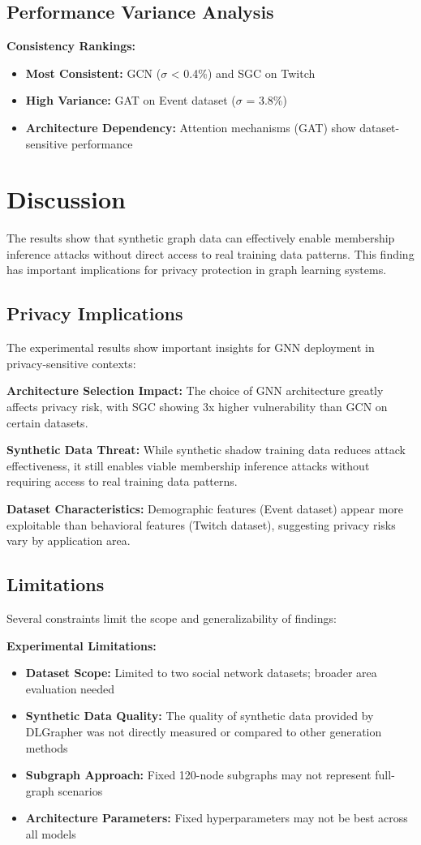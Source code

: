 \documentclass{article}
\begin{document}
\subsection{Performance Variance Analysis}
\textbf{Consistency Rankings:}
\begin{itemize}
\item \textbf{Most Consistent:} GCN ($\sigma$ < 0.4\%) and SGC on Twitch
\item \textbf{High Variance:} GAT on Event dataset ($\sigma$ = 3.8\%)
\item \textbf{Architecture Dependency:} Attention mechanisms (GAT) show dataset-sensitive performance
\end{itemize}

\section{Discussion}
The results show that synthetic graph data can effectively enable membership inference attacks without direct access to real training data patterns. This finding has important implications for privacy protection in graph learning systems.

\subsection{Privacy Implications}
The experimental results show important insights for GNN deployment in privacy-sensitive contexts:

\textbf{Architecture Selection Impact:} The choice of GNN architecture greatly affects privacy risk, with SGC showing 3x higher vulnerability than GCN on certain datasets.

\textbf{Synthetic Data Threat:} While synthetic shadow training data reduces attack effectiveness, it still enables viable membership inference attacks without requiring access to real training data patterns.

\textbf{Dataset Characteristics:} Demographic features (Event dataset) appear more exploitable than behavioral features (Twitch dataset), suggesting privacy risks vary by application area.


\subsection{Limitations}
Several constraints limit the scope and generalizability of findings:

\textbf{Experimental Limitations:}
\begin{itemize}
\item \textbf{Dataset Scope:} Limited to two social network datasets; broader area evaluation needed
\item \textbf{Synthetic Data Quality:} The quality of synthetic data provided by DLGrapher was not directly measured or compared to other generation methods
\item \textbf{Subgraph Approach:} Fixed 120-node subgraphs may not represent full-graph scenarios
\item \textbf{Architecture Parameters:} Fixed hyperparameters may not be best across all models
\end{itemize}
\end{document}
